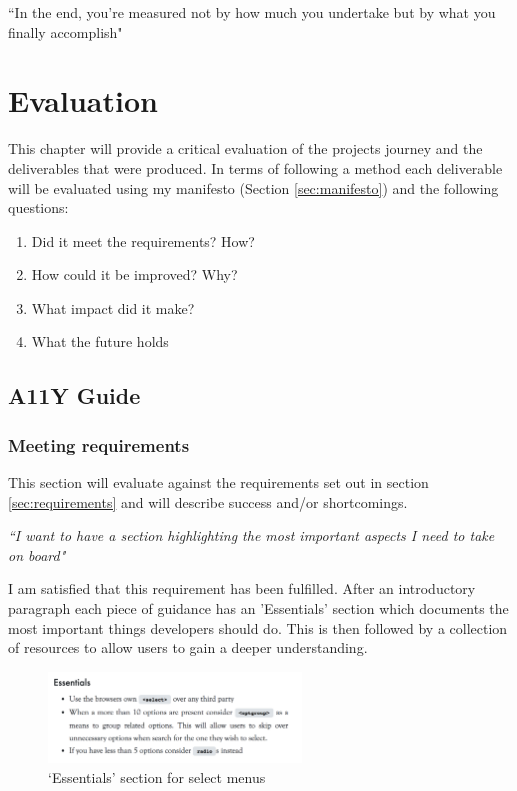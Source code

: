 \begin{savequote}[75mm]
``In the end, you're measured not by how much you undertake but by what you
finally accomplish"
\end{savequote}

\chapter{Evaluation}
This chapter will provide a critical evaluation of the projects journey and
the deliverables that were produced. In terms of following a method each
deliverable will be evaluated using my manifesto (Section
\ref{sec:manifesto}) and the following questions:
\begin{enumerate}
\item Did it meet the requirements? How?
\item How could it be improved? Why?
\item What impact did it make?
\item What the future holds
\end{enumerate}

\section{A11Y Guide}
\subsection{Meeting requirements}
This section will evaluate against the requirements set out in section
\ref{sec:requirements} and will describe success and/or shortcomings.

\begin{center}
\textit{``I want to have a section highlighting the most important aspects I
need to take on board"}
\end{center}
I am satisfied that this requirement has been fulfilled. After an
introductory paragraph each piece of guidance has an 'Essentials' section
which documents the most important things developers should do. This is then followed
by a collection of resources to allow users to gain a deeper understanding.
\begin{figure}[H]
\centering
\includegraphics[width=0.6\textwidth]{figures/guide_essentials}
\captionsetup{justification=centering}
\caption{`Essentials' section for select menus
\label{fig:guide_essentials}}
\end{figure}

